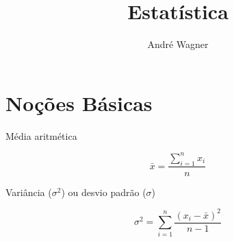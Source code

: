 \documentclass[a4paper, twocolumn]{article}
\author{André Wagner}
\title{Estatística}
\date{}
\begin{document}
\section{Noções Básicas}

Média aritmética

\[ \bar{x} = \frac{\displaystyle\sum^n_{i=1} x_i}{n} \]

Variância ($\sigma^2$) ou desvio padrão ($\sigma$)

\[ \sigma^2 = \sum^n_{i=1} \frac{(x_i-\bar{x})^2}{n-1} \]
\end{document}
